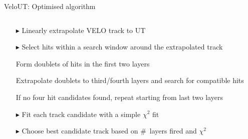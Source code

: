 \documentclass[aspectratio=1610]{beamer}
\begin{document}
\begin{frame}{VeloUT: Optimised algorithm}
\begin{columns}
\begin{column}{0.5\textwidth}
\begin{itemize}
  \item[$\blacktriangleright$] Linearly extrapolate VELO track to UT
  \item[$\blacktriangleright$] Select hits within a search window around the extrapolated track
  \item[\ding{80}] Form doublets of hits in the first two layers
  \item[\ding{80}] Extrapolate doublets to third/fourth layers and search for compatible hits
  \item[\ding{80}] If no four hit candidates found, repeat starting from last two layers
  \item[$\blacktriangleright$] Fit each track candidate with a simple $\chi^{2}$ fit%
  \item[$\blacktriangleright$] Choose best candidate track based on \mbox{\# layers} fired and $\chi^{2}$
  \end{itemize}
\end{column}
\begin{column}{0.5\textwidth}
\centering

\end{column}
\end{columns}
\end{frame}
\end{document}
